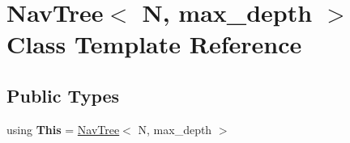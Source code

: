 \hypertarget{classNavTree}{}\section{Nav\+Tree$<$ N, max\+\_\+depth $>$ Class Template Reference}
\label{classNavTree}
\subsection*{Public Types}
\begin{DoxyCompactItemize}
\item 
\mbox{\label{classNavTree_ad7f054678bae8142d1a9017c8a0944f4}} 
using {\bfseries This} = \hyperlink{classNavTree}{Nav\+Tree}$<$ N, max\+\_\+depth $>$
\end{DoxyCompactItemize}
